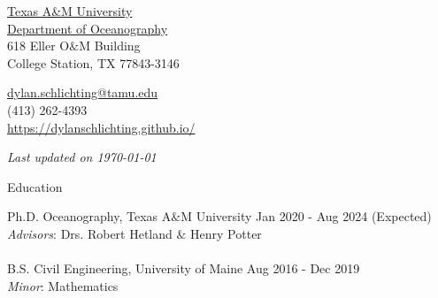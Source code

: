 \documentclass{resume} %
\newcommand{\updateinfo}[1][\today]{\par\vfill{\textit{Last updated on #1}}}
\begin{document}
\begin{minipage}[ht]{0.35\textwidth}
  \href{http://www.tamu.edu/}{Texas A\&M University} \\
  \href{http://ocean.tamu.edu/}{Department of Oceanography} \\
  618 Eller O$\&$M Building  \\
  College Station, TX 77843-3146
\end{minipage}
\begin{minipage}[ht]{0.6\textwidth}
  \href{mailto:dylan.schlichting@tamu.edu}{dylan.schlichting@tamu.edu} \\
  (413) 262-4393\\
  \url{https://dylanschlichting.github.io/}
  \updateinfo
\end{minipage}
\vspace{-65 pt}

\vspace{60pt}
\begin{rSection}{Education}

Ph.D. Oceanography, Texas A$\&$M 
University \hfill {Jan 2020 - Aug 2024 (Expected)
}
\\
\textit{Advisors}: Drs. Robert Hetland $\&$ Henry Potter
\\
\\
B.S. Civil Engineering, University of Maine \hfill {Aug 2016 - Dec 2019}
\\ 
{\textit{Minor}:} Mathematics
\end{rSection}
\end{document}
